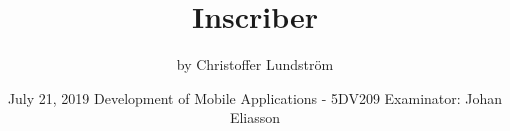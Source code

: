 \documentclass[]{article}
\begin{document}
	\begin{titlepage}
		\centering
		\title{Inscriber}
		\author{by Christoffer Lundström}
		\date{\centering
			July 21, 2019\endgraf\vspace{2cm}\endgraf
			Development of Mobile Applications - 5DV209\endgraf
			Examinator: Johan Eliasson\endgraf
			}
		\maketitle
		\thispagestyle{empty}
	\end{titlepage}
	\newpage
	\tableofcontents
	\thispagestyle{empty}
	\newpage
	
\end{document}
